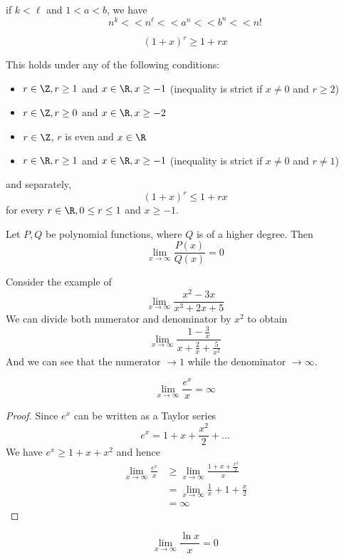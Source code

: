 if $k<\ell$ and $1<a<b$, we have
$$
  n^k << n^\ell << a^n << b^n << n!
$$

\label{d44713f}
$$
  (1+x)^r\geq 1+rx
$$

This holds under any of the following conditions:
\begin{itemize}
  \item $r\in\Z,r\geq1$ and $x\in\R,x\geq-1$ (inequality is strict if
        $x\neq0$ and $r\geq2$)
  \item $r\in\Z,r\geq0$ and $x\in\R,x\geq-2$
  \item $r\in\Z$, $r$ is even and $x\in\R$
  \item $r\in\R,r\geq1$ and $x\in\R,x\geq-1$ (inequality is strict if
        $x\neq0$ and $r\neq1$)
\end{itemize}

and separately,
$$
  (1+x)^r\leq 1+rx
$$
for every $r\in\R,0\leq r\leq 1$ and $x\geq-1$.

\label{ccfddb1}

Let $P,Q$ be polynomial functions, where $Q$ is of a higher degree. Then
$$
  \lim_{x\to\infty}\frac{P(x)}{Q(x)}=0
$$

\begin{compute}
  Consider the example of
  $$
    \lim_{x\to\infty}\frac{x^2 - 3x}{x^3 + 2x + 5}
  $$
  We can divide both numerator and denominator by $x^2$ to obtain
  $$
    \lim_{x\to\infty}\frac{1 - \frac3x}{x + \frac2x + \frac5{x^2}}
  $$
  And we can see that the numerator $\to1$ while the denominator
  $\to\infty$.
\end{compute}

\label{b905ee7}
$$
  \lim_{x\to\infty}\frac{e^x}x=\infty
$$

\begin{proof}
  Since $e^x$ can be written as a Taylor series
  $$
    e^x=1 + x + \frac{x^2}2 +\ldots
  $$
  We have $e^x\geq 1 + x + x^2$ and hence
  \begin{align*}
    \lim_{x\to\infty}\frac{e^x}x
     & \geq\lim_{x\to\infty}\frac{1+x+\frac{x^2}2}x \\
     & =\lim_{x\to\infty}\frac1x + 1 + \frac{x}2    \\
     & = \infty
  \end{align*}
\end{proof}

\label{e2e1632}
$$
  \lim_{x\to\infty}\frac{\ln x}x = 0
$$

